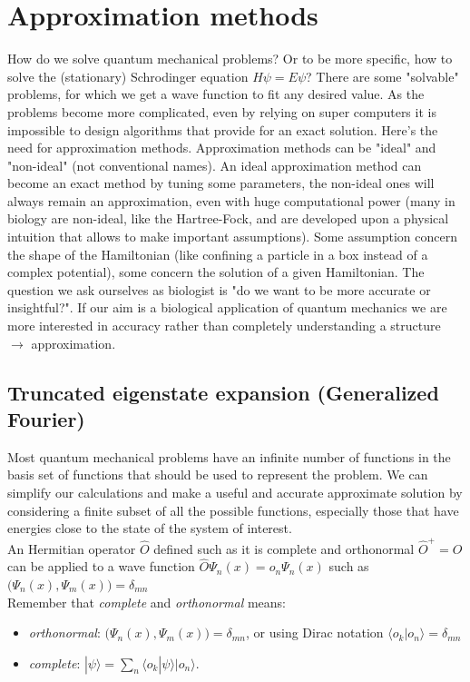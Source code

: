 \graphicspath{{chapters/05/}}
\chapter{Approximation methods}
How do we solve quantum mechanical problems? Or to be more specific, how to solve the (stationary) Schrodinger equation $ H \psi = E \psi$? There are some "solvable" problems, for which we get a wave function to fit any desired value. As the problems become more complicated, even by relying on super computers it is impossible to design algorithms that provide for an exact solution. Here's the need for approximation methods. Approximation methods can be "ideal" and "non-ideal" (not conventional names). An ideal approximation method can become an exact method by tuning some parameters, the non-ideal ones will always remain an approximation, even with huge computational power (many in biology are non-ideal, like the Hartree-Fock, and are developed upon a physical intuition that allows to make important assumptions).
Some assumption concern the shape of the Hamiltonian (like confining a particle in a box instead of a complex potential), some concern the solution of a given Hamiltonian. 
The question we ask ourselves as biologist is "do we want to be more accurate or insightful?". If our aim is a biological application of quantum mechanics we are more interested in accuracy rather than completely understanding a structure $\rightarrow$ approximation.
\section{Truncated eigenstate expansion (Generalized Fourier)}
Most quantum mechanical problems have an infinite number of functions in the basis set of functions that should be used to represent the problem. We can simplify our calculations and make a useful and accurate approximate solution by considering a finite subset of all the possible functions, especially those that have energies close to the state of the system of interest.\\
An Hermitian operator $\hat{O}$ defined such as it is complete and orthonormal $\hat{O}^+=\hat{O}$ can be applied to a wave function $\hat{O}\Psi_n(x)=o_n\Psi_n(x)$ such as $\bigl(\Psi_n(x),\Psi_m(x)\bigr)=\delta_{mn}$\\
Remember that \textit{complete} and \textit{orthonormal} means:
\begin{itemize}
\item \textit{orthonormal}: $\bigl(\Psi_n(x),\Psi_m(x)\bigr)=\delta_{mn}$, or using Dirac notation $\langle o_k|o_n \rangle = \delta_{mn}$
\item \textit{complete}: $ | \psi \rangle = \sum_n \langle o_k | \psi \rangle |o_n \rangle$.
\end{itemize}

